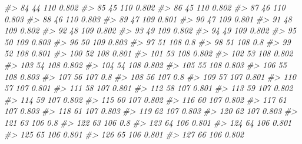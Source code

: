 \documentclass[
]{book}
\newenvironment{Shaded}{\begin{snugshade}}{\end{snugshade}}
\newcommand{\CommentTok}[1]{\textcolor[rgb]{0.56,0.35,0.01}{\textit{#1}}}
\begin{document}
\begin{Shaded}
\begin{Highlighting}[]
\CommentTok{\#\textgreater{} 84          44      110 0.802}
\CommentTok{\#\textgreater{} 85          45      110 0.802}
\CommentTok{\#\textgreater{} 86          45      110 0.802}
\CommentTok{\#\textgreater{} 87          46      110 0.803}
\CommentTok{\#\textgreater{} 88          46      110 0.803}
\CommentTok{\#\textgreater{} 89          47      109 0.801}
\CommentTok{\#\textgreater{} 90          47      109 0.801}
\CommentTok{\#\textgreater{} 91          48      109 0.802}
\CommentTok{\#\textgreater{} 92          48      109 0.802}
\CommentTok{\#\textgreater{} 93          49      109 0.802}
\CommentTok{\#\textgreater{} 94          49      109 0.802}
\CommentTok{\#\textgreater{} 95          50      109 0.803}
\CommentTok{\#\textgreater{} 96          50      109 0.803}
\CommentTok{\#\textgreater{} 97          51      108   0.8}
\CommentTok{\#\textgreater{} 98          51      108   0.8}
\CommentTok{\#\textgreater{} 99          52      108 0.801}
\CommentTok{\#\textgreater{} 100         52      108 0.801}
\CommentTok{\#\textgreater{} 101         53      108 0.802}
\CommentTok{\#\textgreater{} 102         53      108 0.802}
\CommentTok{\#\textgreater{} 103         54      108 0.802}
\CommentTok{\#\textgreater{} 104         54      108 0.802}
\CommentTok{\#\textgreater{} 105         55      108 0.803}
\CommentTok{\#\textgreater{} 106         55      108 0.803}
\CommentTok{\#\textgreater{} 107         56      107   0.8}
\CommentTok{\#\textgreater{} 108         56      107   0.8}
\CommentTok{\#\textgreater{} 109         57      107 0.801}
\CommentTok{\#\textgreater{} 110         57      107 0.801}
\CommentTok{\#\textgreater{} 111         58      107 0.801}
\CommentTok{\#\textgreater{} 112         58      107 0.801}
\CommentTok{\#\textgreater{} 113         59      107 0.802}
\CommentTok{\#\textgreater{} 114         59      107 0.802}
\CommentTok{\#\textgreater{} 115         60      107 0.802}
\CommentTok{\#\textgreater{} 116         60      107 0.802}
\CommentTok{\#\textgreater{} 117         61      107 0.803}
\CommentTok{\#\textgreater{} 118         61      107 0.803}
\CommentTok{\#\textgreater{} 119         62      107 0.803}
\CommentTok{\#\textgreater{} 120         62      107 0.803}
\CommentTok{\#\textgreater{} 121         63      106   0.8}
\CommentTok{\#\textgreater{} 122         63      106   0.8}
\CommentTok{\#\textgreater{} 123         64      106 0.801}
\CommentTok{\#\textgreater{} 124         64      106 0.801}
\CommentTok{\#\textgreater{} 125         65      106 0.801}
\CommentTok{\#\textgreater{} 126         65      106 0.801}
\CommentTok{\#\textgreater{} 127         66      106 0.802}

\end{Highlighting}
\end{Shaded}
\end{document}
